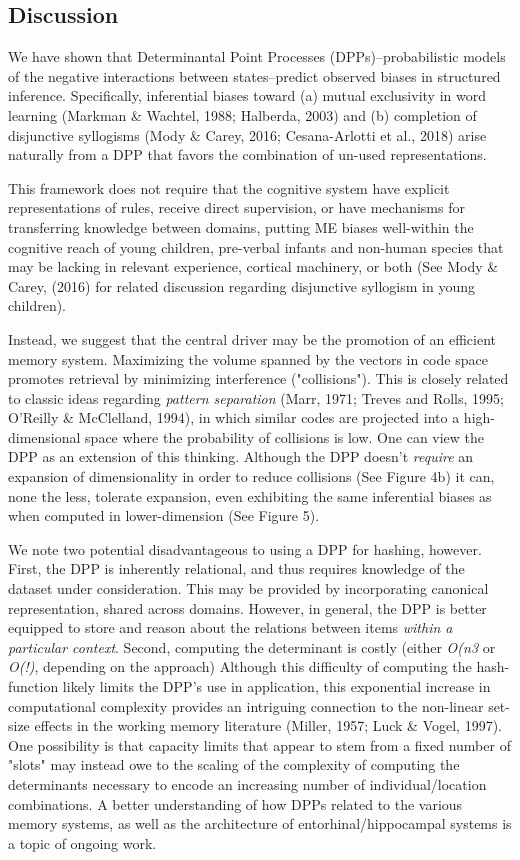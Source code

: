 \documentclass[10pt,letterpaper]{article}
\begin{document}
\subsection{Discussion}
 We have shown that Determinantal Point Processes (DPPs)--probabilistic models of the negative interactions between states--predict observed biases in structured inference. Specifically, inferential biases toward (a) mutual exclusivity in word learning (Markman \& Wachtel, 1988; Halberda, 2003) and (b) completion of disjunctive syllogisms (Mody \& Carey, 2016; Cesana-Arlotti et al., 2018) arise naturally from a DPP that favors the combination of un-used representations.


This framework does not require that the cognitive system have explicit representations of rules, receive direct supervision, or have mechanisms for transferring knowledge between domains, putting ME biases well-within the cognitive reach of young children, pre-verbal infants and non-human species that may be lacking in relevant experience, cortical machinery, or both (See Mody \& Carey, (2016) for related discussion regarding disjunctive syllogism in young children).

Instead, we suggest that the central driver may be the promotion of an efficient memory system. Maximizing the volume spanned by the vectors in code space promotes retrieval by minimizing interference ("collisions"). This is closely related to classic ideas regarding \textit{pattern separation} (Marr, 1971; Treves and Rolls, 1995; O'Reilly & McClelland, 1994), in which similar codes are projected into a high-dimensional space where the probability of collisions is low. One can view the DPP as an extension of this thinking. Although the DPP doesn't 
\textit{require} an expansion of dimensionality in order to reduce collisions (See Figure 4b) it can, none the less, tolerate expansion, even exhibiting the same inferential biases as when computed in lower-dimension (See Figure 5).

We note two potential disadvantageous to using a DPP for hashing, however. First, the DPP is inherently relational, and thus requires knowledge of the dataset under consideration. This may be provided by incorporating canonical representation, shared across domains. However, in general, the DPP is better equipped to store and reason about the relations between items \textit{within a particular context}. Second, computing the determinant is costly (either \textit{O(n3} or \textit{O(!)}, depending on the approach) Although this difficulty of computing the hash-function likely limits the DPP's use in application, this exponential increase in computational complexity provides an intriguing connection to the non-linear set-size effects in the working  memory literature (Miller, 1957; Luck \& Vogel, 1997). One possibility is that capacity limits that appear to stem from a fixed number of "slots" may instead owe to the scaling of the complexity of computing the determinants necessary to encode an increasing number of individual/location combinations. A better understanding of how DPPs related to the various memory systems, as well as the architecture of entorhinal/hippocampal systems is a topic of ongoing work.
\end{document}
